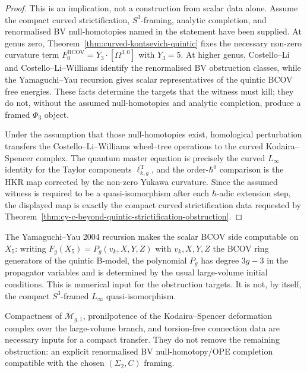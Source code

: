 \begin{proof}
This is an implication, not a construction from scalar data alone.
Assume the compact curved strictification, $S^3$-framing, analytic
completion, and renormalised BV null-homotopies named in the statement
have been supplied. At genus zero, Theorem~\ref{thm:curved-kontsevich-quintic}
fixes the necessary non-zero curvature term
$F_0^{\mathrm{BCOV}}=Y_3\cdot[\Omega^{3,0}]$ with $Y_3=5$.
At higher genus, Costello--Li and Costello--Li--Williams identify the
renormalised BV obstruction classes, while the Yamaguchi--Yau recursion
gives scalar representatives of the quintic BCOV free energies. These
facts determine the targets that the witness must kill; they do not,
without the assumed null-homotopies and analytic completion, produce a
framed $\Phi_3$ object.

Under the assumption that those null-homotopies exist, homological
perturbation transfers the Costello--Li--Williams wheel--tree operations
to the curved Kodaira--Spencer complex. The quantum master equation is
precisely the curved $L_\infty$ identity for the Taylor components
$\ell_{k,g}^{\mathrm T}$, and the order-$\hbar^0$ comparison is the HKR
map corrected by the non-zero Yukawa curvature. Since the assumed
witness is required to be a quasi-isomorphism after each $\hbar$-adic
extension step, the displayed map is exactly the compact curved
strictification data requested by
Theorem~\ref{thm:cy-c-beyond-quintic-strictification-obstruction}.
\end{proof}

\begin{remark}
\label{rem:yamaguchi-yau-recursion-closed-form}
The Yamaguchi--Yau 2004 recursion makes the scalar BCOV side
computable on $X_5$: writing $F_g(X_5) = P_g(v_k, X, Y, Z)$ with
$v_k, X, Y, Z$ the BCOV ring generators of the quintic B-model, the
polynomial $P_g$ has degree $3g - 3$ in the propagator variables and is
determined by the usual large-volume initial conditions. This is
numerical input for the obstruction targets. It is not, by itself, the
compact $S^3$-framed $L_\infty$ quasi-isomorphism.
\end{remark}

\begin{remark}
\label{rem:compactness-griffiths}
Compactness of $\overline{\mathcal M}_{g,1}$, pronilpotence of the
Kodaira--Spencer deformation complex over the large-volume branch, and
torsion-free connection data are necessary inputs for a compact
transfer. They do not remove the remaining obstruction: an explicit
renormalised BV null-homotopy/OPE completion compatible with the chosen
$(\Sigma_2,C)$ framing.
\end{remark}

